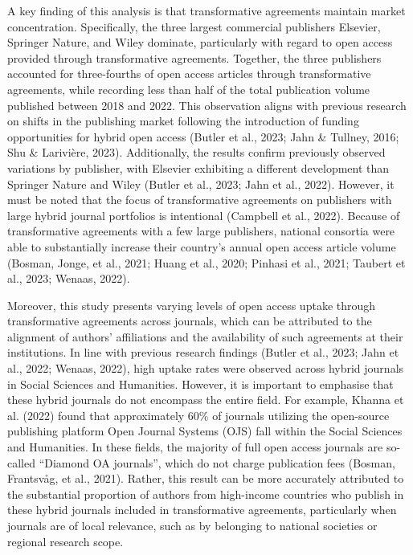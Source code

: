 \documentclass[a4paper,man,floatsintext,longtable,noextraspace,12pt]{apa6}
\begin{document}
A key finding of this analysis is that transformative agreements
maintain market concentration. Specifically, the three largest
commercial publishers Elsevier, Springer Nature, and Wiley dominate,
particularly with regard to open access provided through transformative
agreements. Together, the three publishers accounted for three-fourths
of open access articles through transformative agreements, while
recording less than half of the total publication volume published
between 2018 and 2022. This observation aligns with previous research on
shifts in the publishing market following the introduction of funding
opportunities for hybrid open access (Butler et al., 2023; Jahn \&
Tullney, 2016; Shu \& Larivière, 2023). Additionally, the results
confirm previously observed variations by publisher, with Elsevier
exhibiting a different development than Springer Nature and Wiley
(Butler et al., 2023; Jahn et al., 2022). However, it must be noted that
the focus of transformative agreements on publishers with large hybrid
journal portfolios is intentional (Campbell et al., 2022). Because of
transformative agreements with a few large publishers, national
consortia were able to substantially increase their country's annual
open access article volume (Bosman, Jonge, et al., 2021; Huang et al.,
2020; Pinhasi et al., 2021; Taubert et al., 2023; Wenaas, 2022).

Moreover, this study presents varying levels of open access uptake
through transformative agreements across journals, which can be
attributed to the alignment of authors' affiliations and the
availability of such agreements at their institutions. In line with
previous research findings (Butler et al., 2023; Jahn et al., 2022;
Wenaas, 2022), high uptake rates were observed across hybrid journals in
Social Sciences and Humanities. However, it is important to emphasise
that these hybrid journals do not encompass the entire field. For
example, Khanna et al. (2022) found that approximately 60\% of journals
utilizing the open-source publishing platform Open Journal Systems (OJS)
fall within the Social Sciences and Humanities. In these fields, the
majority of full open access journals are so-called ``Diamond OA
journals'', which do not charge publication fees (Bosman, Frantsvåg, et
al., 2021). Rather, this result can be more accurately attributed to the
substantial proportion of authors from high-income countries who publish
in these hybrid journals included in transformative agreements,
particularly when journals are of local relevance, such as by belonging
to national societies or regional research scope.
\end{document}
